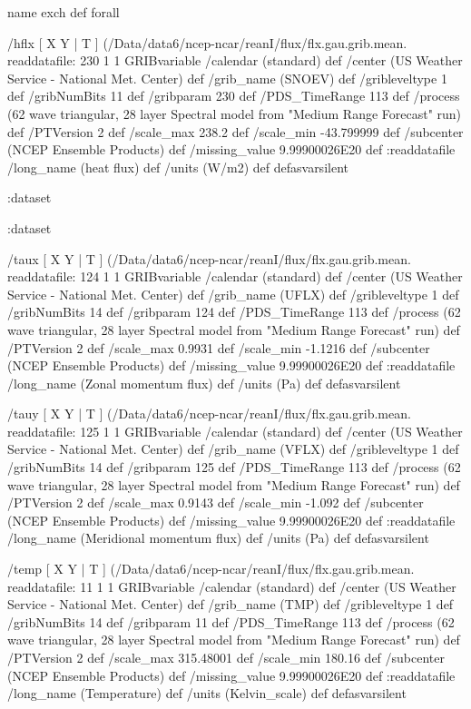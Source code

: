 \begin{ingrid}
    [ X Y T ] { name exch def } forall

    /hflx { [ X Y | T ] (/Data/data6/ncep-ncar/reanI/flux/flx.gau.grib.mean.%
    readdatafile:
    230 1 1 GRIBvariable
    /calendar (standard) def
    /center (US Weather Service - National Met. Center) def
    /grib_name (SNOEV) def
    /gribleveltype 1 def
    /gribNumBits 11 def
    /gribparam 230 def
    /PDS_TimeRange 113 def
    /process (62 wave triangular, 28 layer Spectral model from "Medium Range Forecast" run) def
    /PTVersion 2 def
    /scale_max 238.2 def
    /scale_min -43.799999 def
    /subcenter (NCEP Ensemble Products) def
    /missing_value 9.99900026E20 def
    :readdatafile
    /long_name (heat flux) def
    /units (W/m2) def
    } defasvarsilent
 
   :dataset

  :dataset

  /taux { [ X Y | T ] (/Data/data6/ncep-ncar/reanI/flux/flx.gau.grib.mean.%
  readdatafile:
  124 1 1 GRIBvariable
  /calendar (standard) def
  /center (US Weather Service - National Met. Center) def
  /grib_name (UFLX) def
  /gribleveltype 1 def
  /gribNumBits 14 def
  /gribparam 124 def
  /PDS_TimeRange 113 def
  /process (62 wave triangular, 28 layer Spectral model from "Medium Range Forecast" run) def
  /PTVersion 2 def
  /scale_max 0.9931 def
  /scale_min -1.1216 def
  /subcenter (NCEP Ensemble Products) def
  /missing_value 9.99900026E20 def
  :readdatafile
  /long_name (Zonal momentum flux) def
  /units (Pa) def
  } defasvarsilent

  /tauy { [ X Y | T ] (/Data/data6/ncep-ncar/reanI/flux/flx.gau.grib.mean.%
  readdatafile:
  125 1 1 GRIBvariable
  /calendar (standard) def
  /center (US Weather Service - National Met. Center) def
  /grib_name (VFLX) def
  /gribleveltype 1 def
  /gribNumBits 14 def
  /gribparam 125 def
  /PDS_TimeRange 113 def
  /process (62 wave triangular, 28 layer Spectral model from "Medium Range Forecast" run) def
  /PTVersion 2 def
  /scale_max 0.9143 def
  /scale_min -1.092 def
  /subcenter (NCEP Ensemble Products) def
  /missing_value 9.99900026E20 def
  :readdatafile
  /long_name (Meridional momentum flux) def
  /units (Pa) def
  } defasvarsilent

  /temp { [ X Y | T ] (/Data/data6/ncep-ncar/reanI/flux/flx.gau.grib.mean.%
  readdatafile:
  11 1 1 GRIBvariable
  /calendar (standard) def
  /center (US Weather Service - National Met. Center) def
  /grib_name (TMP) def
  /gribleveltype 1 def
  /gribNumBits 14 def
  /gribparam 11 def
  /PDS_TimeRange 113 def
  /process (62 wave triangular, 28 layer Spectral model from "Medium Range Forecast" run) def
  /PTVersion 2 def
  /scale_max 315.48001 def
  /scale_min 180.16 def
  /subcenter (NCEP Ensemble Products) def
  /missing_value 9.99900026E20 def
  :readdatafile
  /long_name (Temperature) def
  /units (Kelvin_scale) def
  } defasvarsilent


\end{ingrid}
